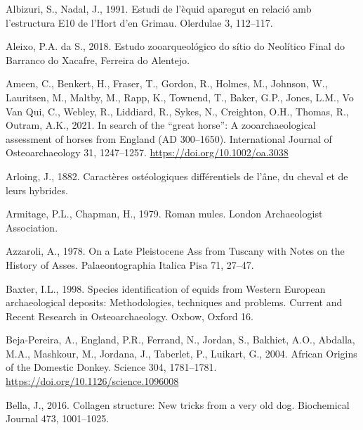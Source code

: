 \documentclass[preprint, 3p, authoryear]{elsarticle} %
\newlength{\cslhangindent}
\newlength{\cslentryspacingunit} %
\newenvironment{CSLReferences}[2] %
 {%
  \setlength{\parindent}{0pt}
  \ifodd #1
  \let\oldpar\par
  \def\par{\hangindent=\cslhangindent\oldpar}
  \fi
  \setlength{\parskip}{#2\cslentryspacingunit}
 }%
 {}
\begin{document}
\hypertarget{refs}{}
\begin{CSLReferences}{1}{0}
\leavevmode{}%
Albizuri, S., Nadal, J., 1991. Estudi de l'èquid aparegut en relació amb l'estructura {E10} de l'{Hort} d'en {Grimau}. Olerdulae 3, 112--117.

\leavevmode{}%
Aleixo, P.A. da S., 2018. Estudo zooarqueológico do sítio do {Neolítico Final} do {Barranco} do {Xacafre}, {Ferreira} do {Alentejo}.

\leavevmode{}%
Ameen, C., Benkert, H., Fraser, T., Gordon, R., Holmes, M., Johnson, W., Lauritsen, M., Maltby, M., Rapp, K., Townend, T., Baker, G.P., Jones, L.M., Vo Van Qui, C., Webley, R., Liddiard, R., Sykes, N., Creighton, O.H., Thomas, R., Outram, A.K., 2021. In search of the {``great horse''}: {A} zooarchaeological assessment of horses from {England} ({AD} 300--1650). International Journal of Osteoarchaeology 31, 1247--1257. \url{https://doi.org/10.1002/oa.3038}

\leavevmode{}%
Arloing, J., 1882. Caractères ostéologiques différentiels de l'âne, du cheval et de leurs hybrides.

\leavevmode{}%
Armitage, P.L., Chapman, H., 1979. Roman mules. {London Archaeologist Association}.

\leavevmode{}%
Azzaroli, A., 1978. On a {Late Pleistocene Ass} from {Tuscany}\textbar{} with {Notes} on the {History} of {Asses}. Palaeontographia Italica Pisa 71, 27--47.

\leavevmode{}%
Baxter, I.L., 1998. Species identification of equids from {Western European} archaeological deposits: Methodologies, techniques and problems. Current and Recent Research in Osteoarchaeology. Oxbow, Oxford 16.

\leavevmode{}%
Beja-Pereira, A., England, P.R., Ferrand, N., Jordan, S., Bakhiet, A.O., Abdalla, M.A., Mashkour, M., Jordana, J., Taberlet, P., Luikart, G., 2004. African {Origins} of the {Domestic Donkey}. Science 304, 1781--1781. \url{https://doi.org/10.1126/science.1096008}

\leavevmode{}%
Bella, J., 2016. Collagen structure: New tricks from a very old dog. Biochemical Journal 473, 1001--1025.


\end{CSLReferences}
\end{document}
